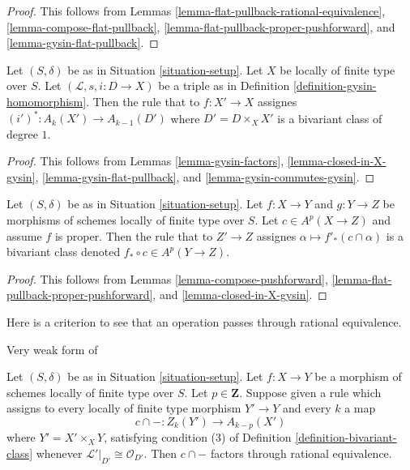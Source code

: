 \begin{proof}
This follows from
Lemmas \ref{lemma-flat-pullback-rational-equivalence},
\ref{lemma-compose-flat-pullback},
\ref{lemma-flat-pullback-proper-pushforward}, and
\ref{lemma-gysin-flat-pullback}.
\end{proof}

\begin{lemma}
\label{lemma-gysin-bivariant}
Let $(S, \delta)$ be as in Situation \ref{situation-setup}.
Let $X$ be locally of finite type over $S$.
Let $(\mathcal{L}, s, i : D \to X)$ be a triple as in
Definition \ref{definition-gysin-homomorphism}.
Then the rule that to $f : X' \to X$ assignes
$(i')^* : A_k(X') \to A_{k - 1}(D')$ where $D' = D \times_X X'$
is a bivariant class of degree $1$.
\end{lemma}

\begin{proof}
This follows from Lemmas \ref{lemma-gysin-factors},
\ref{lemma-closed-in-X-gysin},
\ref{lemma-gysin-flat-pullback}, and
\ref{lemma-gysin-commutes-gysin}.
\end{proof}

\begin{lemma}
\label{lemma-push-proper-bivariant}
Let $(S, \delta)$ be as in Situation \ref{situation-setup}.
Let $f : X \to Y$ and $g : Y \to Z$ be morphisms of
schemes locally of finite type over $S$.
Let $c \in A^p(X \to Z)$ and assume $f$ is proper.
Then the rule that to $Z' \to Z$ assignes
$\alpha \longmapsto f'_*(c \cap \alpha)$
is a bivariant class denoted $f_* \circ c \in A^p(Y \to Z)$.
\end{lemma}

\begin{proof}
This follows from Lemmas \ref{lemma-compose-pushforward},
\ref{lemma-flat-pullback-proper-pushforward}, and
\ref{lemma-closed-in-X-gysin}.
\end{proof}

\noindent
Here is a criterion to see that an operation
passes through rational equivalence.

\begin{lemma}
\label{lemma-factors-through-rational-equivalence}
\begin{reference}
Very weak form of \cite[Theorem 17.1]{F}
\end{reference}
Let $(S, \delta)$ be as in Situation \ref{situation-setup}.
Let $f : X \to Y$ be a morphism of schemes locally of finite type over $S$.
Let $p \in \mathbf{Z}$. Suppose given a rule
which assigns to every locally of finite type morphism $Y' \to Y$
and every $k$ a map
$$
c \cap - : Z_k(Y') \longrightarrow A_{k - p}(X')
$$
where $Y' = X' \times_X Y$, satisfying condition (3) of
Definition \ref{definition-bivariant-class}
whenever $\mathcal{L}'|_{D'} \cong \mathcal{O}_{D'}$. Then
$c \cap -$ factors through rational equivalence.
\end{lemma}

